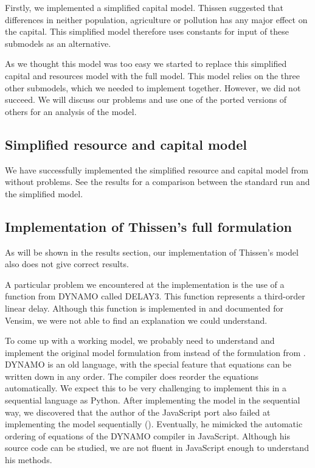 \documentclass[10pt,a4paper]{scrartcl}
\begin{document}
Firstly, we implemented a simplified capital model. Thissen suggested that differences in neither population, agriculture or pollution has any major effect on the capital. This simplified model therefore uses constants for input of these submodels as an alternative.

As we thought this model was too easy we started to replace this simplified capital and resources model with the full model. This model relies on the three other submodels, which we needed to implement together. However, we did not succeed. We will discuss our problems and use one of the ported versions of others for an analysis of the model.

\subsection*{Simplified resource and capital model}

We have successfully implemented the simplified resource and capital model from \cite{thissen1978investigations} without problems. See the results for a comparison between the standard run and the simplified model.

\subsection*{Implementation of Thissen's full formulation}

As will be shown in the results section, our implementation of Thissen's model also does not give correct results.

A particular problem we encountered at the implementation is the use of a function from DYNAMO called DELAY3. This function represents a third-order linear delay. Although this function is implemented in and documented for Vensim, we were not able to find an explanation we could understand.

To come up with a working model, we probably need to understand and implement the original model formulation from \cite{forresterworld} instead of the formulation from \cite{thissen1978investigations}. DYNAMO is an old language, with the special feature that equations can be written down in any order. The compiler does reorder the equations automatically. We expect this to be very challenging to implement this in a sequential language as Python.  After implementing the model in the sequential way, we discovered that the author of the JavaScript port also failed at implementing the model sequentially (\cite{blogpost}). Eventually, he mimicked the automatic ordering of equations of the DYNAMO compiler in JavaScript. Although his source code can be studied, we are not fluent in JavaScript enough to understand his methods.
\end{document}

